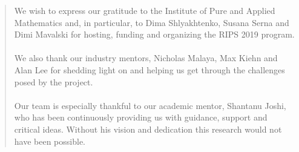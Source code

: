 

\begin{quote}
We wish to express our gratitude to the Institute of Pure and Applied Mathematics and, in particular, to Dima Shlyakhtenko, Susana Serna and Dimi Mavalski for hosting, funding and organizing the RIPS 2019 program.
\\\hspace{\fill}\\
We also thank our industry mentors, Nicholas Malaya, Max Kiehn and Alan Lee for shedding light on and helping us get through the challenges posed by the project.
\\\hspace{\fill}\\
Our team is especially thankful to our academic mentor, Shantanu Joshi, who has been continuously providing us with guidance, support and critical ideas. Without his vision and dedication this research would not have been possible.
\end{quote}




